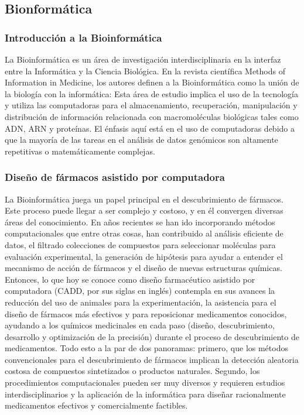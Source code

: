 \subsection{Bionformática}
\subsubsection{Introducción a la Bioinformática}
\noindent La Bioinformática es un área de investigación interdisciplinaria en la interfaz entre la Informática y la Ciencia Biológica.
En la revista científica Methods of Information in Medicine\cite{3}, los autores definen a la Bioinformática como la unión de la biología con la informática: Esta área de estudio implica el uso de la tecnología y utiliza las computadoras para el almacenamiento, recuperación, manipulación y distribución de información relacionada con macromoléculas biológicas tales como ADN, ARN y proteínas. El énfasis aquí está en el uso de computadoras debido a que la mayoría de las tareas en el análisis de datos genómicos son altamente repetitivas o matemáticamente complejas.\\
\subsubsection{Diseño de fármacos asistido por computadora}
\noindent La Bioinformática juega un papel principal en el descubrimiento de fármacos. Este proceso puede llegar a ser complejo y costoso, y en él convergen diversas áreas del conocimiento. En años recientes se han ido incorporando métodos computacionales que entre otras cosas, han contribuido al análisis eficiente de datos, el filtrado colecciones de compuestos para seleccionar moléculas para evaluación experimental, la generación de hipótesis para ayudar a entender el mecanismo de acción de fármacos y el diseño de nuevas estructuras químicas.\\

\noindent Entonces, lo que hoy se conoce como diseño farmacéutico asistido por computadora (CADD, por sus siglas en inglés) contempla en sus avances la reducción del uso de animales para la experimentación, la asistencia para el diseño de fármacos más efectivos y para reposicionar medicamentos conocidos, ayudando a los químicos medicinales en cada paso (diseño, descubrimiento, desarrollo y optimización de la precisión) durante el proceso de descubrimiento de medicamentos. Todo esto a la par de dos panoramas: primero, que los métodos convencionales para el descubrimiento de fármacos implican la detección aleatoria costosa de compuestos sintetizados o productos naturales. Segundo, los procedimientos computacionales pueden ser muy diversos y requieren estudios interdisciplinarios y la aplicación de la informática para diseñar racionalmente medicamentos efectivos y comercialmente factibles.\cite{4}\\

